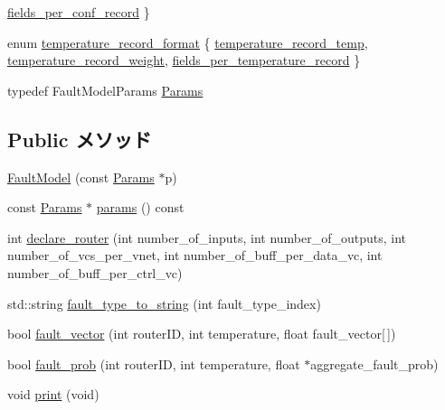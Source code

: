 \begin{DoxyCompactItemize}
\par
\hyperlink{classFaultModel_a892d29ada597232548383eb62e8cf21fa07bd82f54a5768393897ffc8ac9cc552}{fields\_\-per\_\-conf\_\-record}
 \}
\item 
enum \hyperlink{classFaultModel_a84543b68245449294e82d04eb844d743}{temperature\_\-record\_\-format} \{ \hyperlink{classFaultModel_a84543b68245449294e82d04eb844d743a403451297f147cd7d99fb6d8551c85bb}{temperature\_\-record\_\-temp}, 
\hyperlink{classFaultModel_a84543b68245449294e82d04eb844d743a9c15194df607ea0aa56be4487a131c7d}{temperature\_\-record\_\-weight}, 
\hyperlink{classFaultModel_a84543b68245449294e82d04eb844d743a188f80d79d5384c287be5edd519c6d8a}{fields\_\-per\_\-temperature\_\-record}
 \}
\item 
typedef FaultModelParams \hyperlink{classFaultModel_a7375aa39205bda869bcfb089a9163679}{Params}
\end{DoxyCompactItemize}
\subsection*{Public メソッド}
\begin{DoxyCompactItemize}
\item 
\hyperlink{classFaultModel_ad0752b1f7980300e4978b8ed20041fdc}{FaultModel} (const \hyperlink{classFaultModel_a7375aa39205bda869bcfb089a9163679}{Params} $\ast$p)
\item 
const \hyperlink{classFaultModel_a7375aa39205bda869bcfb089a9163679}{Params} $\ast$ \hyperlink{classFaultModel_acd3c3feb78ae7a8f88fe0f110a718dff}{params} () const 
\item 
int \hyperlink{classFaultModel_a9b0afb8ab704de6844484a41ecbad75f}{declare\_\-router} (int number\_\-of\_\-inputs, int number\_\-of\_\-outputs, int number\_\-of\_\-vcs\_\-per\_\-vnet, int number\_\-of\_\-buff\_\-per\_\-data\_\-vc, int number\_\-of\_\-buff\_\-per\_\-ctrl\_\-vc)
\item 
std::string \hyperlink{classFaultModel_a0b3a049c6918c05b4fb8a7702d65dd93}{fault\_\-type\_\-to\_\-string} (int fault\_\-type\_\-index)
\item 
bool \hyperlink{classFaultModel_a25ca83d60796d678cc73f46c3553368b}{fault\_\-vector} (int routerID, int temperature, float fault\_\-vector\mbox{[}$\,$\mbox{]})
\item 
bool \hyperlink{classFaultModel_ac7d54b266bf5b3e7b3054fdd875d89df}{fault\_\-prob} (int routerID, int temperature, float $\ast$aggregate\_\-fault\_\-prob)
\item 
void \hyperlink{classFaultModel_a7e8442e7139d840c15bdee83789f7ae8}{print} (void)
\end{DoxyCompactItemize}
